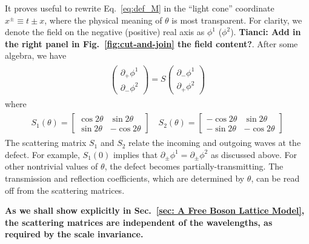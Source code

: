 It proves useful to rewrite Eq.~\eqref{eq:def_M} in the ``light cone'' coordinate $x^\pm\equiv t\pm x$, where the physical meaning of $\theta$ is most transparent. For clarity, we denote the field on the negative (positive) real axis as $\phi^1$ ($\phi^2$). {\bf\color{red}Tianci: Add in the right panel in Fig.~\ref{fig:cut-and-join} the field content?}. After some algebra, we have
\begin{eqnarray}\begin{aligned}
\label{eq:def_S}
\begin{pmatrix}
\partial_+\phi^1\\
\partial_-\phi^2
\end{pmatrix}
=S
\begin{pmatrix}
\partial_-\phi^1\\
\partial_+\phi^2
\end{pmatrix}
\end{aligned}\end{eqnarray}
where 
\begin{eqnarray}\begin{aligned}
S_1(\theta)=\begin{bmatrix}
\cos 2\theta & \sin 2\theta \\
\sin 2\theta & -\cos 2\theta
\end{bmatrix}\quad
S_2(\theta)=\begin{bmatrix}
-\cos 2\theta & \sin 2\theta \\
-\sin 2\theta & -\cos 2\theta
\end{bmatrix}
\end{aligned}\end{eqnarray}
The scattering matrix $S_1$ and $S_2$ relate the incoming and outgoing waves at the defect. For example, $S_1(0)$ implies that $\partial_\pm\phi^{1}=\partial_\pm\phi^{2}$ as discussed above. For other nontrivial values of $\theta$, the defect becomes partially-transmitting. The transmission and reflection coefficients, which are determined by $\theta$, can be read off from the scattering matrices.

{\bf\color{red}As we shall show explicitly in Sec.~\ref{sec: A Free Boson Lattice Model}, the scattering matrices are independent of the wavelengths, as required by the scale invariance.}

